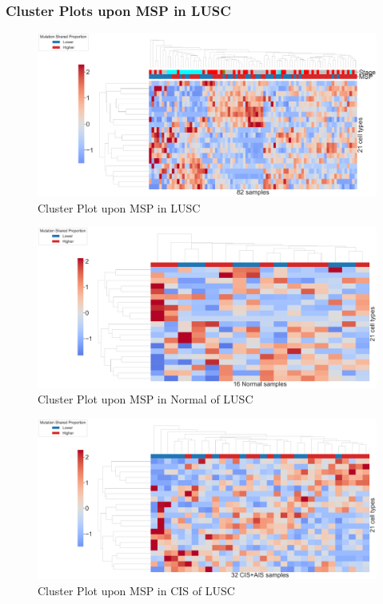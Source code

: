 \documentclass{beamer}
\begin{document}
    \begin{frame}[allowframebreaks]
        \frametitle{Cluster Plots upon MSP in LUSC}

        \begin{figure}
            \includegraphics[width=0.9 \linewidth]{figures/BisqueRNA/clustermap/STAR.FPKM.GSE162498.SQC.MSP-median/Mutation Shared Proportion-All.pdf}
            \caption{Cluster Plot upon MSP in LUSC}
        \end{figure}

        \begin{figure}
            \includegraphics[width=0.9 \linewidth]{figures/BisqueRNA/clustermap/STAR.FPKM.GSE162498.SQC.MSP-median/Mutation Shared Proportion-Normal.pdf}
            \caption{Cluster Plot upon MSP in Normal of LUSC}
        \end{figure}

        \begin{figure}
            \includegraphics[width=0.9 \linewidth]{figures/BisqueRNA/clustermap/STAR.FPKM.GSE162498.SQC.MSP-median/Mutation Shared Proportion-CIS+AIS.pdf}
            \caption{Cluster Plot upon MSP in CIS of LUSC}
        \end{figure}


\end{frame}
\end{document}
